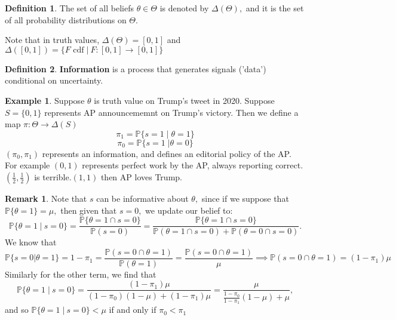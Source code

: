 \documentclass[10pt, oneside]{article}
\newcommand{\bbP}{\mathbb{P}}
\theoremstyle{definition}
\newtheorem{exmp}{Example}[section]
\newtheorem{defn}{Definition}
\newtheorem{rem}{Remark}
\begin{document}
\begin{defn}
    The set of all beliefs $\theta \in \Theta$ is denoted by $\Delta(\Theta),$ and it is the set of all probability distributions on $\Theta.$
\end{defn}
Note that in truth values, $\Delta(\Theta) = [0,1]$ and $\Delta([0,1]) = \{F \text{ cdf} \; | \: F: [0,1] \to [0,1]\}$

\begin{defn}
    \textbf{Information} is a process that generates signals ('data') conditional on uncertainty.
\end{defn}
\begin{exmp}
    Suppose $\theta$ is truth value on Trump's tweet in 2020. Suppose $S = \{0,1\}$ represents AP announcememnt on Trump's victory. Then we define a map $\pi: \Theta \to \Delta(S)$
    \[\pi_1 = \bbP\{s = 1 \; | \; \theta = 1\}\]
    \[\pi_0 = \bbP\{s = 1 \;  | \theta = 0\}\] $(\pi_0, \pi_1)$ represents an information, and defines an editorial policy of the AP. For example $(0,1)$ represents perfect work by the AP, always reporting correct. $(\frac{1}{2}, \frac{1}{2})$ is terrible.$(1,1)$ then AP loves Trump.
\end{exmp}
\begin{rem}
    Note that $s$ can be informative about $\theta,$ since if we suppose that $\bbP\{\theta = 1\} = \mu,$ then given that $s = 0,$ we update our belief to:
    \[\bbP\{\theta = 1 \; | \: s = 0\} = \frac{\bbP\{\theta = 1 \cap s = 0\}}{\bbP(s = 0)}= \frac{\bbP\{\theta = 1 \cap s = 0\}}{\bbP(\theta = 1 \cap s = 0) + \bbP(\theta = 0 \cap s=0)}.\] We know that 
    \[\bbP\{s = 0 | \theta = 1\} = 1-\pi_1 = \frac{\bbP(s = 0 \cap \theta = 1)}{\bbP(\theta = 1)} = \frac{\bbP(s = 0 \cap \theta = 1)}{\mu} \implies \bbP(s = 0 \cap \theta = 1) = (1-\pi_1)\mu\] Similarly for the other term, we find that 
    \[\bbP\{\theta = 1 \; | \: s = 0\} = \frac{(1-\pi_1)\mu}{(1-\pi_0)(1-\mu) + (1-\pi_1)\mu} = \frac{\mu}{\frac{1-\pi_0}{1-\pi_1}(1-\mu) + \mu},\] and so $\bbP\{\theta = 1 \; | \: s = 0\} < \mu$ if and only if $\pi_0 < \pi_1$
\end{rem}
\end{document}
